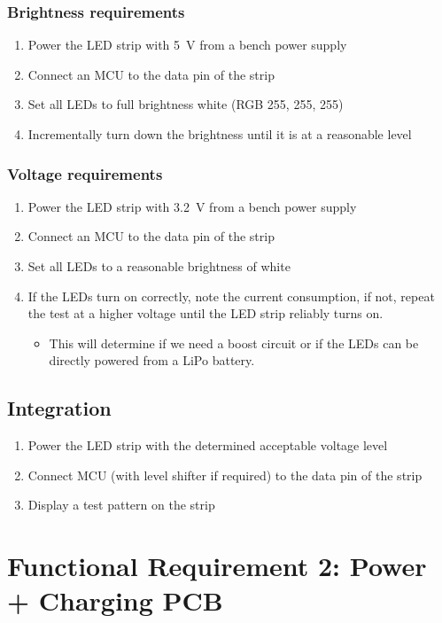 \documentclass{notes}
\begin{document}
\subsubsection{Brightness requirements}
\begin{enumerate}
    \item Power the LED strip with \SI{5}{\volt} from a bench power supply
    \item Connect an MCU to the data pin of the strip
    \item Set all LEDs to full brightness white (RGB 255, 255, 255)
    \item Incrementally turn down the brightness until it is at a reasonable level
\end{enumerate}

\subsubsection{Voltage requirements}
\begin{enumerate}
    \item Power the LED strip with \SI{3.2}{\volt} from a bench power supply
    \item Connect an MCU to the data pin of the strip
    \item Set all LEDs to a reasonable brightness of white
    \item If the LEDs turn on correctly, note the current consumption, if not, repeat the test at a higher voltage until the LED strip reliably turns on.
    \begin{itemize}
        \item This will determine if we need a boost circuit or if the LEDs can be directly powered from a LiPo battery.
    \end{itemize}
\end{enumerate}

\subsection{Integration}
\begin{enumerate}
    \item Power the LED strip with the determined acceptable voltage level
    \item Connect MCU (with level shifter if required) to the data pin of the strip
    \item Display a test pattern on the strip
\end{enumerate}

\section{Functional Requirement 2: Power + Charging PCB}
\label{sec:fr2}
\end{document}
